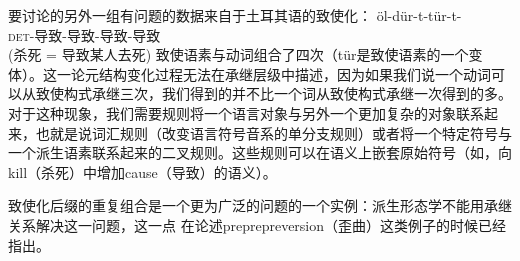 要讨论的另外一组有问题的数据来自于土耳其语的致使化\citep[]{Lewis67a-u}：
\ea
\gll öl-dür-t-tür-t- \\
\textsc{det}-导致-导致-导致-导致\\
(杀死 = 导致某人去死)
\z
致使语素与动词组合了四次（tür是致使语素的一个变体）。这一论元结构变化过程无法在承继层级中描述，因为如果我们说一个动词可以从致使构式承继三次，我们得到的并不比一个词从致使构式承继一次得到的多。对于这种现象，我们需要规则将一个语言对象与另外一个更加复杂的对象联系起来，也就是说词汇规则（改变语言符号音系的单分支规则）或者将一个特定符号与一个派生语素联系起来的二叉规则。这些规则可以在语义上嵌套原始符号（如，向kill（杀死）中增加cause（导致）的语义）。

致使化后缀的重复组合是一个更为广泛的问题的一个实例：派生形态学不能用承继关系解决这一问题，这一点 \citet{KN93a}在论述preprepreversion（歪曲）这类例子的时候已经指出。

